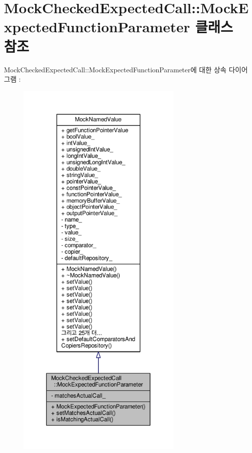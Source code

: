 \hypertarget{class_mock_checked_expected_call_1_1_mock_expected_function_parameter}{}\section{Mock\+Checked\+Expected\+Call\+:\+:Mock\+Expected\+Function\+Parameter 클래스 참조}
\label{class_mock_checked_expected_call_1_1_mock_expected_function_parameter}


Mock\+Checked\+Expected\+Call\+:\+:Mock\+Expected\+Function\+Parameter에 대한 상속 다이어그램 \+: 
\nopagebreak
\begin{figure}[H]
\begin{center}
\leavevmode
\includegraphics[height=550pt]{class_mock_checked_expected_call_1_1_mock_expected_function_parameter__inherit__graph}
\end{center}
\end{figure}


